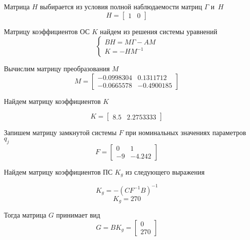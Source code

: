 Матрица $H$ выбирается из условия полной наблюдаемости матриц $\Gamma$ и~$H$
\begin{equation}
	H = 
	\begin{bmatrix}
	1 & 0
	\end{bmatrix}
\end{equation}

Матрицу коэффициентов ОС $K$ найдем из решения системы уравнений
\begin{equation}
	\begin{cases}
	 B H = M \Gamma - A M\\
	 K = - H M^{-1}
	\end{cases}
\end{equation}

Вычислим матрицу преобразования $M$
\begin{equation}
	M = 
	\begin{bmatrix}
	  - 0.0998304 &   0.1311712\\
	  - 0.0665578 & - 0.4900185  	
	\end{bmatrix}
\end{equation}

Найдем матрицу коэффициентов $K$

\begin{equation}\label{Kq}
	K = 
	\begin{bmatrix}
	 8.5  &  2.2753333
	\end{bmatrix}
\end{equation}

Запишем матрицу замкнутой системы $F$ при номинальных значениях параметров $q_j$
\begin{equation}
	F = 
	\begin{bmatrix}
	   0 &    1\\     
	- 9&  - 4.242
	\end{bmatrix}
\end{equation}

Найдем матрицу коэффициентов ПС $K_g$ из следующего выражения

\begin{equation}
	K_g = - (C F^{-1} B)^{-1}
\end{equation}
\begin{equation}
	K_g = 270
\end{equation}

Тогда матрица $G$ принимает вид
\begin{equation}
	G = B K_g = 
	\begin{bmatrix}
	0\\ 
	270
	\end{bmatrix}
\end{equation}

